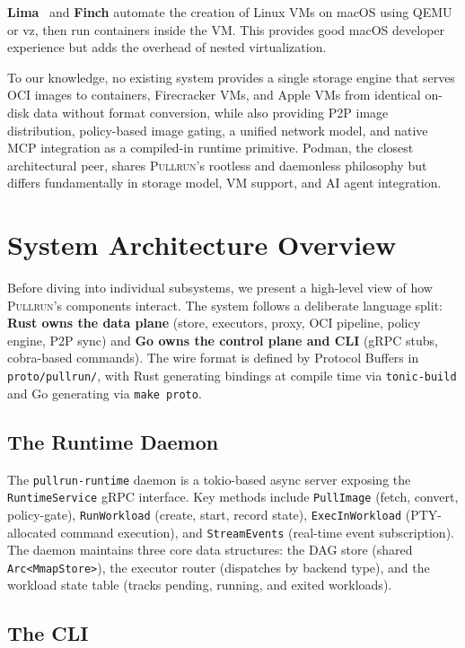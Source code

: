 \documentclass[11pt,a4paper]{article}
\newcommand{\pullrun}{\textsc{Pullrun}}
\begin{document}
\textbf{Lima}~\cite{lima} and \textbf{Finch} automate the creation of Linux VMs on macOS using QEMU or vz, then run containers inside the VM. This provides good macOS developer experience but adds the overhead of nested virtualization.

To our knowledge, no existing system provides a single storage engine that serves OCI images to containers, Firecracker VMs, and Apple VMs from identical on-disk data without format conversion, while also providing P2P image distribution, policy-based image gating, a unified network model, and native MCP integration as a compiled-in runtime primitive. Podman, the closest architectural peer, shares \pullrun{}'s rootless and daemonless philosophy but differs fundamentally in storage model, VM support, and AI agent integration.

\section{System Architecture Overview}\label{sec:architecture}

Before diving into individual subsystems, we present a high-level view of how \pullrun{}'s components interact. The system follows a deliberate language split: \textbf{Rust owns the data plane} (store, executors, proxy, OCI pipeline, policy engine, P2P sync) and \textbf{Go owns the control plane and CLI} (gRPC stubs, cobra-based commands). The wire format is defined by Protocol Buffers in \texttt{proto/pullrun/}, with Rust generating bindings at compile time via \texttt{tonic-build} and Go generating via \texttt{make proto}.

\subsection{The Runtime Daemon}

The \texttt{pullrun-runtime} daemon is a tokio-based async server exposing the \texttt{RuntimeService} gRPC interface. Key methods include \texttt{PullImage} (fetch, convert, policy-gate), \texttt{RunWorkload} (create, start, record state), \texttt{ExecInWorkload} (PTY-allocated command execution), and \texttt{StreamEvents} (real-time event subscription). The daemon maintains three core data structures: the DAG store (shared \texttt{Arc<MmapStore>}), the executor router (dispatches by backend type), and the workload state table (tracks pending, running, and exited workloads).

\subsection{The CLI}
\end{document}
